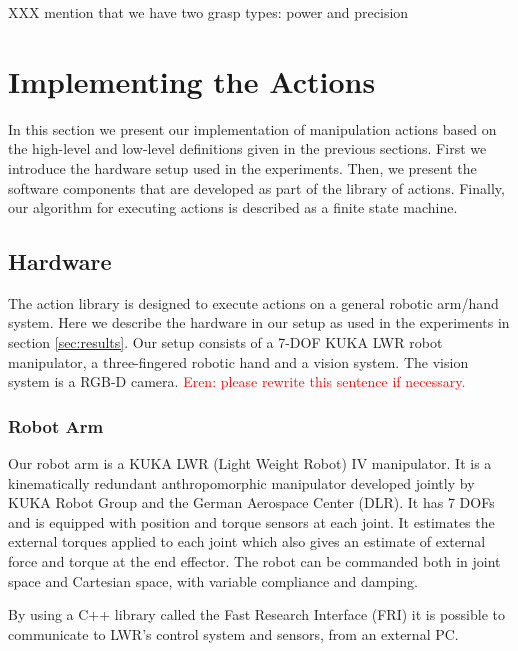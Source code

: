 XXX mention that we have two grasp types: power and precision


\section{Implementing the Actions}
\label{sec:Implementing}

In this section we present our implementation of manipulation actions based on the high-level and low-level definitions given in the previous sections.
First we introduce the hardware setup used in the experiments.
Then, we present the software components that are developed as part of the library of actions.
Finally, our algorithm for executing actions is described as a finite state machine.



\subsection{Hardware}
\label{sec:hardware}
The action library is designed to execute actions on a general robotic arm/hand system.
Here we describe the hardware in our setup as used in the experiments in section \ref{sec:results}.
Our setup consists of a 7-DOF KUKA LWR robot manipulator, a three-fingered robotic hand and a vision system. 
The vision system is a RGB-D camera. \textcolor{red}{Eren: please rewrite this sentence if necessary.}


\subsubsection{Robot Arm}
Our robot arm is a KUKA LWR (Light Weight Robot) IV manipulator.
It is a kinematically redundant anthropomorphic manipulator developed jointly by KUKA Robot Group and the German Aerospace Center (DLR).
It has 7 DOFs and is equipped with position and torque sensors at each joint.
It estimates the external torques applied to each joint which also gives an estimate of external force and torque at the end effector.
The robot can be commanded both in joint space and Cartesian space, with variable compliance and damping.

By using a C++ library called the Fast Research Interface (FRI) it is possible to communicate to LWR's control system and sensors, from an external PC.


